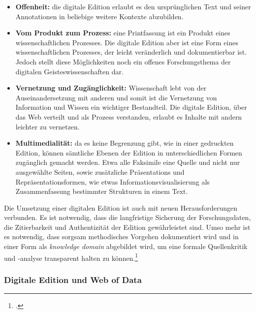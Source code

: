 \documentclass[12pt,a4paper]{article}
\begin{document}
\begin{itemize}
\item \textbf{Offenheit:} die digitale Edition erlaubt es den ursprünglichen Text und seiner Annotationen in beliebige weitere Kontexte abzubilden. 
\item \textbf{Vom Produkt zum Prozess:} eine Printfassung ist ein Produkt eines wissenschaftlichen Prozesses. Die digitale Edition aber ist eine Form eines wissenschaftlichen Prozesses, der leicht veränderlich und dokumentierbar ist. Jedoch stellt diese Möglichkeiten noch ein offenes Forschungsthema der digitalen Geisteswissenschaften dar.
\item \textbf{Vernetzung und Zugänglichkeit:} Wissenschaft lebt von der Auseinandersetzung mit anderen und somit ist die Vernetzung von Information und Wissen ein wichtiger Bestandteil. Die digitale Edition, über das Web verteilt und als Prozess verstanden, erlaubt es Inhalte mit andern leichter zu vernetzen.  
\item 
\textbf{Multimedialität:} da es keine Begrenzung gibt, wie in einer gedruckten Edition, können sämtliche Ebenen der Edition in unterschiedlichen Formen zugänglich gemacht werden. Etwa alle Faksimile eine Quelle und nicht nur ausgewählte Seiten, sowie zusätzliche Präsentations und Repräsentationsformen, wie etwas Informationsvisualisierung als Zusammenfassung bestimmter Strukturen in einem Text. 
\end{itemize}
Die Umsetzung einer digitalen Edition ist auch mit neuen Herausforderungen verbunden. Es ist notwendig, dass die langfristige Sicherung der Forschungsdaten, die Zitierbarkeit und Authentizität der Edition gewährleistet sind. Umso mehr ist es notwendig, dass sorgsam methodisches Vorgehen dokumentiert wird und in einer Form als \textit{knowledge domain} abgebildet wird, um eine formale Quellenkritik und -analyse transparent halten zu können.\footcite[][S.306-315]{kropavc2004theorien}


\subsubsection{Digitale Edition und Web of Data}
\end{document}
